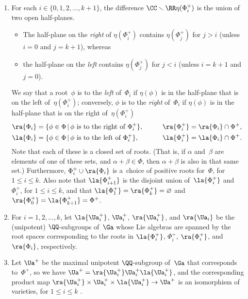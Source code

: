 \begin{notation}
\begin{enumerate}
\item For each $i \in \{0,1,2,\ldots,k+1\}$, the difference $\CC \smallsetminus \RR \eta(\Phi^+_i)$ is the union of two open half-planes.
\begin{itemize}\itemsep=0pt
\item The half-plane on the \emph{right} of $\eta(\Phi^+_i)$ contains $\eta(\Phi^+_j)$ for $j > i$ (unless $i = 0$ and $j = k+1$), whereas
\item the half-plane on the \emph{left} contains $\eta(\Phi^+_j)$ for $j < i$ (unless $i = k + 1$ and $j = 0$).
\end{itemize}
We say that a root~$\phi$ is to the \emph{left} of~$\Phi_i$ if $\eta(\phi)$ is in the half-plane that is on the left of~$\eta(\Phi^+_i)$; conversely, $\phi$ is to the \emph{right} of~$\Phi_i$ if $\eta(\phi)$ is in the half-plane that is on the right of~$\eta(\Phi^+_i)$
		\begin{alignat*}{3}
		& \ra{\Phi_i}= \{ \phi \in \Phi \,|\, \text{$\phi$ is to the right of $\Phi^+_i$} \},
		\qquad &&
		\ra{\Phi^+_i}= \ra{\Phi_i} \cap \Phi^+,& \\
		&\la{\Phi_i}= \{ \phi \in \Phi \,|\, \text{$\phi$ is to the left of $\Phi^+_i$} \},
		\qquad &&
		\la{\Phi^+_i}= \la{\Phi_i} \cap \Phi^+		.&
\end{alignat*}
Note that each of these is a closed set of roots. (That is, if $\alpha$ and~$\beta$ are elements of one of these sets, and $\alpha + \beta \in \Phi$, then $\alpha + \beta$ is also in that same set.)
Furthermore, $\Phi_i^+ \cup \ra{\Phi_i}$ is a~choice of positive roots for~$\Phi$, for $1 \le i \le k$.
Also note that $\la{\Phi^+_{i+1}}$ is the disjoint union of~$\la{\Phi^+_i}$ and~$\Phi^+_i$, for $1 \le i \le k$, and that
	 $\la{\Phi^+_1} = \ra{\Phi^+_k} = \varnothing$ and $\ra{\Phi^+_0} = \la{\Phi^+_{k+1}} = \Phi^+$.
\item For $i = 1,2,\ldots,k$, let $\la{\Ua_i^+}$, $\Ua_i^+$, $\ra{\Ua_i^+}$, and $\ra{\Ua_i}$ be the (unipotent) $\QQ$-subgroups of~$\Ga$ whose Lie algebras are spanned by the root spaces corresponding to the roots in $\la{\Phi_i^+}$, $\Phi_i^+$, $\ra{\Phi_i^+}$, and $\ra{\Phi_i}$, respectively.
\item Let $\Ua^+$ be the maximal unipotent $\QQ$-subgroup of~$\Ga$ that corresponds to~$\Phi^+$, so we have $\Ua^+ = \ra{\Ua_i^+} \Ua^+_i \la{\Ua_i^+}$, and the corresponding product map $\ra{\Ua_i^+} \times \Ua^+_i \times \la{\Ua_i^+} \to \Ua^+$ is an isomorphism of varieties, for $1 \le i \le k$ \cite[Proposition~3.11, pp.~77--78]{BorelTits-GrpRed}.
	

\end{enumerate}
\end{notation}
